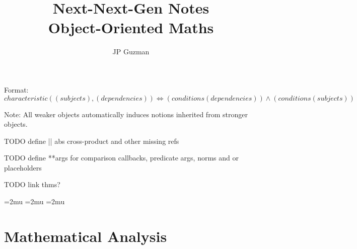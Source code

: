 \documentclass[a4paper]{article}
\title{Next-Next-Gen Notes \\
\large Object-Oriented Maths}
\author{JP Guzman}
\begin{document}
\maketitle
\allowdisplaybreaks

Format: $characteristic((subjects), (dependencies)) \iff (conditions(dependencies)) \land (conditions(subjects))$

Note: All weaker objects automatically induces notions inherited from stronger objects.

TODO define || abs  cross-product and other missing refs

TODO define **args for comparison callbacks, predicate args, norms and or placeholders

TODO link thms?

\thinmuskip=2mu %
\medmuskip=2mu %
\thickmuskip=2mu %
\setlength{\belowdisplayskip}{0pt} \setlength{\belowdisplayshortskip}{0pt}
\setlength{\abovedisplayskip}{0pt} \setlength{\abovedisplayshortskip}{0pt}

\section{Mathematical Analysis}
\end{document}
